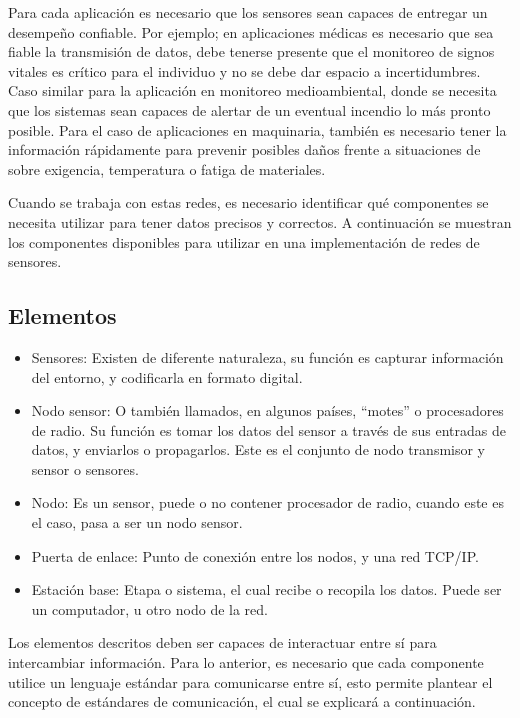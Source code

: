 Para cada aplicación es necesario que los sensores sean capaces de entregar un desempeño confiable. Por ejemplo; en aplicaciones médicas es necesario que sea fiable la transmisión de datos, debe tenerse presente que el monitoreo de signos vitales es crítico para el individuo y no se debe dar espacio a incertidumbres. Caso similar para la aplicación en monitoreo medioambiental, donde se necesita que los sistemas sean capaces de alertar de un eventual incendio lo más pronto posible. Para el caso de aplicaciones en maquinaria, también es necesario tener la información rápidamente para prevenir posibles daños frente a situaciones de sobre exigencia, temperatura o fatiga de materiales.

Cuando se trabaja con estas redes, es necesario identificar qué componentes se necesita utilizar para tener datos precisos y correctos. A continuación se muestran los componentes disponibles para utilizar en una implementación de redes de sensores.




\subsection{Elementos}

\begin{itemize}
    \item Sensores: Existen de diferente naturaleza, su función es capturar información del entorno, y codificarla en formato digital.
    \item Nodo sensor: O también llamados, en algunos países, ``motes'' o procesadores de radio. Su función es tomar los datos del sensor a través de sus entradas de datos, y enviarlos o propagarlos. Este es el conjunto de nodo transmisor y sensor o sensores.
    \item Nodo: Es un sensor, puede o no contener procesador de radio, cuando este es el caso, pasa a ser un nodo sensor.
    \item Puerta de enlace: Punto de conexión entre los nodos, y una red TCP/IP.
    \item Estación base: Etapa o sistema, el cual recibe o recopila los datos. Puede ser un computador, u otro nodo de la red.
\end{itemize}

Los elementos descritos deben ser capaces de interactuar entre sí para intercambiar información. Para lo anterior, es necesario que cada componente utilice un lenguaje estándar para comunicarse entre sí, esto permite plantear el concepto de estándares de comunicación, el cual se explicará a continuación.




